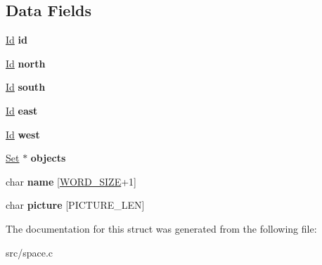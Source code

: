 \subsection*{Data Fields}
\begin{DoxyCompactItemize}
\item 
\mbox{\label{struct__Space_a70cb461deb9ac073e401b607339b567f}} 
\hyperlink{types_8h_a845e604fb28f7e3d97549da3448149d3}{Id} {\bfseries id}
\item 
\mbox{\label{struct__Space_ae5ebe53ce79514d7d2d93911e0159252}} 
\hyperlink{types_8h_a845e604fb28f7e3d97549da3448149d3}{Id} {\bfseries north}
\item 
\mbox{\label{struct__Space_a646b68c22a0bbf1685033c96109d31d1}} 
\hyperlink{types_8h_a845e604fb28f7e3d97549da3448149d3}{Id} {\bfseries south}
\item 
\mbox{\label{struct__Space_a41ce2bf33cf0c157b358221f094ee05b}} 
\hyperlink{types_8h_a845e604fb28f7e3d97549da3448149d3}{Id} {\bfseries east}
\item 
\mbox{\label{struct__Space_a20c1d259e93b44e24ba82982e142eb9b}} 
\hyperlink{types_8h_a845e604fb28f7e3d97549da3448149d3}{Id} {\bfseries west}
\item 
\mbox{\label{struct__Space_a661ed8b0fc8085b6db70188aa5085625}} 
\hyperlink{struct__Set}{Set} $\ast$ {\bfseries objects}
\item 
\mbox{\label{struct__Space_aa1c9c994c2d16ecf3ef46138685fdfdc}} 
char {\bfseries name} \mbox{[}\hyperlink{types_8h_a92ed8507d1cd2331ad09275c5c4c1c89}{W\+O\+R\+D\+\_\+\+S\+I\+ZE}+1\mbox{]}
\item 
\mbox{\label{struct__Space_ab4b3f4af835727b6afe807d2aded4ff2}} 
char {\bfseries picture} \mbox{[}P\+I\+C\+T\+U\+R\+E\+\_\+\+L\+EN\mbox{]}
\end{DoxyCompactItemize}


The documentation for this struct was generated from the following file\+:\begin{DoxyCompactItemize}
\item 
src/space.\+c\end{DoxyCompactItemize}
